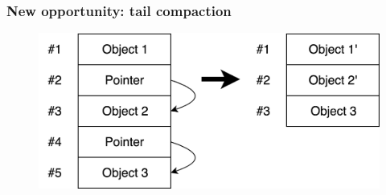 \begin{frame}
  \frametitle{New opportunity: tail compaction}
  \vfill
  \begin{figure}
    \centering
    \includegraphics[scale=0.15]{Tail-compression.png}
  \end{figure}
\end{frame}
